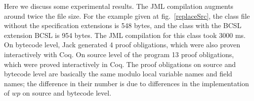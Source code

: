 

Here we discuss some experimental results. 
The JML compilation augments around twice the file size. 
For the example given at fig.~\ref{replaceSrc}, the class file without the specification extensions is 548 bytes, 
and the class with the BCSL extension BCSL is 954 bytes. The JML compilation for this class took 3000 ms. On bytecode level, Jack generated 4 proof obligations,  
which were also proven interactively with Coq. On source level of the program 13 proof obligations, 
which were proved interactively in Coq. The proof obligations on source and bytecode level are basically the same modulo 
 local variable names and field names; the difference in their number is due to differences in the implementation of $wp$ on source and bytecode level. 

